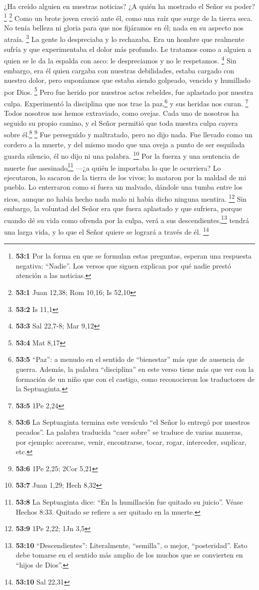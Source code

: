  ¿Ha creído alguien en nuestras noticias? ¿A quién ha
mostrado el Señor su poder?\footnote{\textbf{53:1} Por la forma en que
  se formulan estas preguntas, esperan una respuesta negativa:
  ``Nadie''. Los versos que siguen explican por qué nadie prestó
  atención a las noticias.} \footnote{\textbf{53:1} Juan 12,38; Rom
  10,16; Is 52,10}  Como un brote joven creció ante él,
como una raíz que surge de la tierra seca. No tenía belleza ni gloria
para que nos fijáramos en él; nada en su aspecto nos atraía. \footnote{\textbf{53:2}
  Is 11,1}  La gente lo despreciaba y lo rechazaba. Era un
hombre que realmente sufría y que experimentaba el dolor más profundo.
Le tratamos como a alguien a quien se le da la espalda con asco: le
despreciamos y no le respetamos. \footnote{\textbf{53:3} Sal 22,7-8; Mar
  9,12}  Sin embargo, era él quien cargaba con nuestras
debilidades, estaba cargado con nuestro dolor, pero suponíamos que
estaba siendo golpeado, vencido y humillado por Dios. \footnote{\textbf{53:4}
  Mat 8,17}  Pero fue herido por nuestros actos rebeldes,
fue aplastado por nuestra culpa. Experimentó la disciplina que nos trae
la paz,\footnote{\textbf{53:5} ``Paz'': a menudo en el sentido de
  ``bienestar'' más que de ausencia de guerra. Además, la palabra
  ``disciplina'' en este verso tiene más que ver con la formación de un
  niño que con el castigo, como reconocieron los traductores de la
  Septuaginta.} y sus heridas nos curan. \footnote{\textbf{53:5} 1Pe
  2,24}  Todos nosotros nos hemos extraviado, como ovejas.
Cada uno de nosotros ha seguido su propio camino, y el Señor permitió
que toda nuestra culpa cayera sobre él.\footnote{\textbf{53:6} La
  Septuaginta termina este versículo ``el Señor lo entregó por nuestros
  pecados''. La palabra traducida ``caer sobre'' se traduce de varias
  maneras, por ejemplo: acercarse, venir, encontrarse, tocar, rogar,
  interceder, suplicar, etc.} \footnote{\textbf{53:6} 1Pe 2,25; 2Cor
  5,21}  Fue perseguido y maltratado, pero no dijo nada.
Fue llevado como un cordero a la muerte, y del mismo modo que una oveja
a punto de ser esquilada guarda silencio, él no dijo ni una palabra.
\footnote{\textbf{53:7} Juan 1,29; Hech 8,32}  Por la
fuerza y una sentencia de muerte fue asesinado\footnote{\textbf{53:8} La
  Septuaginta dice: ``En la humillación fue quitado su juicio''. Véase
  Hechos 8:33. Quitado se refiere a ser quitado en la muerte.} ---¿a
quién le importaba lo que le ocurriera? Lo ejecutaron, lo sacaron de la
tierra de los vivos; lo mataron por la maldad de mi pueblo.
 Lo enterraron como si fuera un malvado, dándole una tumba
entre los ricos, aunque no había hecho nada malo ni había dicho ninguna
mentira. \footnote{\textbf{53:9} 1Pe 2,22; 1Jn 3,5}  Sin
embargo, la voluntad del Señor era que fuera aplastado y que sufriera,
porque cuando dé su vida como ofrenda por la culpa, verá a sus
descendientes,\footnote{\textbf{53:10} ``Descendientes'': Literalmente,
  ``semilla'', o mejor, ``posteridad''. Esto debe tomarse en el sentido
  más amplio de los muchos que se convierten en ``hijos de Dios''.}
tendrá una larga vida, y lo que el Señor quiere se logrará a través de
él. \footnote{\textbf{53:10} Sal 22,31}

